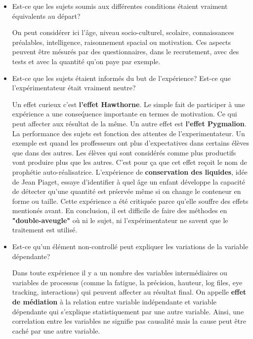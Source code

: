 \begin{itemize}
\item Est-ce que les sujets soumis aux diff\'erentes conditions \'etaient vraiment \'equivalents au d\'epart?

On peut consid\'erer ici l'\^age, niveau socio-culturel, scolaire, connaissances pr\'ealables, intelligence, raisonnement spacial ou motivation. Ces aspects peuvent \^etre m\'esur\'es par des questionnaires, dans le recrutement, avec des tests et avec la quantit\'e qu'on paye par exemple.

\item Est-ce que les sujets \'etaient inform\'es du but de l'exp\'erience? Est-ce que l'exp\'erimentateur \'etait vraiment neutre?

Un effet curieux c'est \textbf{l'effet Hawthorne}. Le simple fait de participer \`a une exp\'erience a une conse\'quence importante en termes de motivation. Ce qui peut affecter aux r\'esultat de la m\^eme. Un autre effet est \textbf{l'effet Pygmalion}. La performance des sujets est fonction des attentes de l'experimentateur. Un exemple est quand les proffesseurs ont plus d'expectatives dans certains \'el\`eves que dans des autres. Les \'el\`eves qui sont consid\'er\'es comme plus productifs vont produire plus que les autres. C'est pour \c{c}a que cet effet re\c{c}oit le nom de proph\'etie auto-r\'ealisatrice. L'exp\'erience de \textbf{conservation des liquides}, id\'ee de Jean Piaget, essaye d'identifier \`a quel \^age un enfant d\'eveloppe la capacit\'e de d\'etecter qu'une quantit\'e est pr\'serv\'ee m\^eme si on change le conteneur en forme ou taille. Cette exp\'erience a \'et\'e critiqu\'ee parce qu'elle souffre des effets mention\'es avant. En conclusion, il est difficile de faire des m\'ethodes en \textbf{"double-aveugle"} o\`u ni le sujet, ni l'exp\'erimentateur ne savent que le traitement est utilis\'e.

\item Est-ce qu'un \'el\'ement non-controll\'e peut expliquer les variations de la variable d\'ependante?

Dans toute exp\'erience il y a un nombre des variables interm\'ediaires ou variables de processus (comme la fatigue, la pr\'ecision, hauteur, log files, eye tracking, interactions) qui peuvent affecter au r\'esultat final. On appelle \textbf{effet de m\'ediation} \`a la relation entre variable ind\'ependante et variable d\'ependante qui s'explique statistiquement par une autre variable. Ainsi, une correlation entre les variables ne signifie pas causalit\'e mais la cause peut \^etre cach\'e par une autre variable.


\end{itemize}
